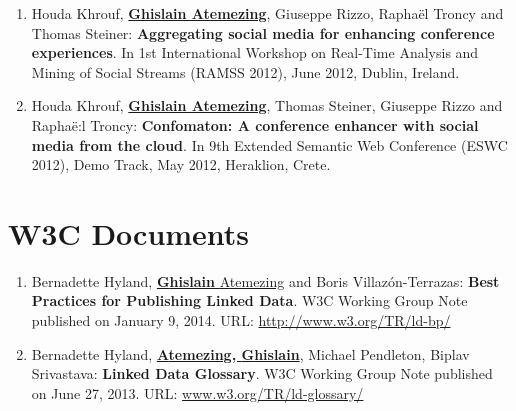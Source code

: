 \begin{enumerate}
 \item Houda Khrouf, \underline{\textbf{Ghislain Atemezing}}, Giuseppe Rizzo, Rapha\"{e}l Troncy and Thomas Steiner: \textbf{Aggregating social media for enhancing conference experiences}. In 1st International Workshop on Real-Time Analysis and Mining of Social Streams (RAMSS 2012), June 2012, Dublin, Ireland.

 \item Houda Khrouf, \underline{\textbf{Ghislain Atemezing}}, Thomas Steiner, Giuseppe Rizzo and Rapha\"{e}:l Troncy: \textbf{Confomaton: A conference enhancer with social media from the cloud}. In 9th Extended Semantic Web Conference (ESWC 2012), Demo Track, May 2012, Heraklion, Crete.

\end{enumerate}

\section*{W3C Documents}
\label{sec:w3cdocs}
\begin{enumerate}
 \item {B}ernadette {H}yland, \underline{\textbf{{G}hislain} {A}temezing} and {B}oris {V}illaz{\'o}n-{T}errazas: \textbf{Best Practices for Publishing Linked Data}. W3C Working Group Note published on January 9, 2014. URL: \url{http://www.w3.org/TR/ld-bp/}

 \item {B}ernadette {H}yland, \underline{\textbf{{A}temezing, {G}hislain}}, {M}ichael {P}endleton, {B}iplav {S}rivastava: \textbf{Linked Data Glossary}. W3C Working Group Note published on June 27, 2013. URL: \url{www.w3.org/TR/ld-glossary/}
\end{enumerate} 